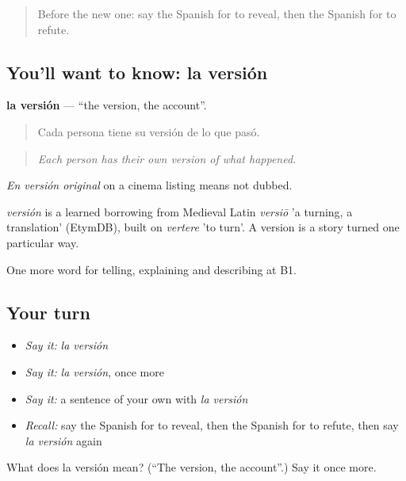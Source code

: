 \label{lesson:ES-C516-version}



\begin{quote}
Before the new one: say the Spanish for to reveal, then the Spanish for to refute.
\end{quote}

\subsection*{You'll want to know: la versión}
\textbf{la versión} — \textquotedblleft{}the version, the account\textquotedblright{}.

\begin{quote}
Cada persona tiene su versión de lo que pasó.
\end{quote}

\begin{quote}
\emph{Each person has their own version of what happened.}
\end{quote}

\emph{En versión original} on a cinema listing means not dubbed.

\begin{cousinweb}
\emph{versión} is a learned borrowing from Medieval Latin \emph{versiō} 'a turning, a translation' (EtymDB), built on \emph{vertere} 'to turn'. A version is a story turned one particular way.
\end{cousinweb}

\begin{grammarlens}[title={What you've built}]
One more word for telling, explaining and describing at B1.
\end{grammarlens}

\subsection*{Your turn}
\begin{itemize}
\raggedright
  \item \emph{Say it:} \emph{la versión}
  \item \emph{Say it:} \emph{la versión}, once more
  \item \emph{Say it:} a sentence of your own with \emph{la versión}
  \item \emph{Recall:} say the Spanish for to reveal, then the Spanish for to refute, then say \emph{la versión} again
\end{itemize}

\begin{tcolorbox}[breakable,colback=teal!4,colframe=teal!35!black,title={Before you move on}]
What does la versión mean? (\textquotedblleft{}The version, the account\textquotedblright{}.) Say it once more.
\end{tcolorbox}
